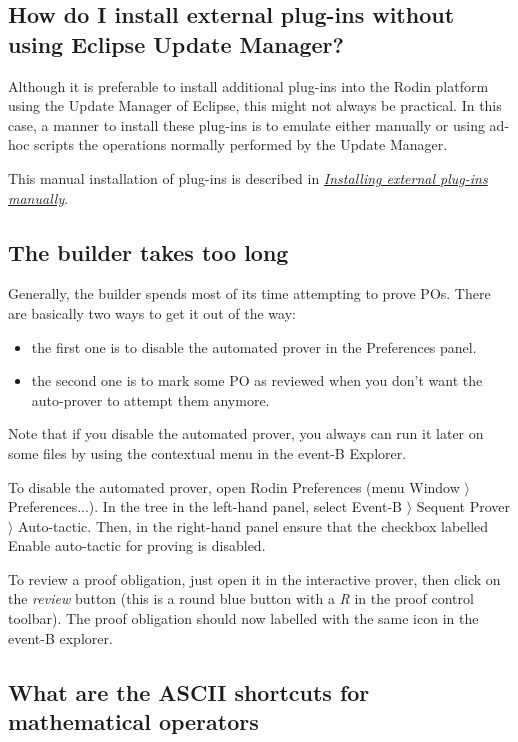 \subsection{How do I install external plug-ins without using Eclipse Update Manager?}

Although it is preferable to install additional plug-ins into the Rodin platform using the Update Manager of Eclipse, this might not always be practical. In this case, a manner to install these plug-ins is to emulate either manually or using ad-hoc scripts the operations normally performed by the Update Manager. 

This manual installation of plug-ins is described in \href{http://wiki.event-b.org/index.php/Installing_external_plug-ins_manually}{\emph{Installing external plug-ins manually}}. 

\subsection{The builder takes too long}

Generally, the builder spends most of its time attempting to prove POs. There are basically two ways to get it out of the way: 

\begin{itemize}
	\item the first one is to disable the automated prover in the Preferences panel. 
	\item the second one is to mark some PO as reviewed when you don't want the auto-prover to attempt them anymore. 
\end{itemize}

Note that if you disable the automated prover, you always can run it later on some files by using the contextual menu in the event-B Explorer. 

To disable the automated prover, open Rodin Preferences 
(menu \textsf{Window $\rangle$ Preferences...}). In the tree in the left-hand panel, select \textsf{Event-B $\rangle$ Sequent Prover $\rangle$ Auto-tactic}. Then, in the right-hand panel ensure that the checkbox labelled Enable \textsf{auto-tactic} for proving is disabled. 

To review a proof obligation, just open it in the interactive prover, then click on the \emph{review} button (this is a round blue button with a \emph{R} in the proof control toolbar). The proof obligation should now labelled with the same icon in the event-B explorer. 

\subsection{What are the ASCII shortcuts for mathematical operators}

